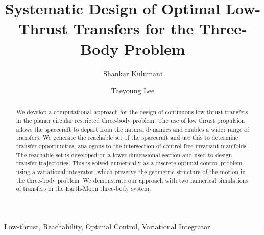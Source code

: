 \documentclass[preprint]{elsarticle}
\begin{document}
\begin{frontmatter}

\title{Systematic Design of Optimal Low-Thrust Transfers for the Three-Body Problem}


\author{Shankar Kulumani}
\address{George Washington University, 800 22nd St NW, Washington, DC 20052}

\author{Taeyoung Lee}
\address{George Washington University, 800 22nd St NW, Washington, DC 20052}


\begin{abstract}
We develop a computational approach for the design of continuous low thrust transfers in the planar circular restricted three-body problem.
The use of low thrust propulsion allows the spacecraft to depart from the natural dynamics and enables a wider range of transfers.
We generate the reachable set of the spacecraft and use this to determine transfer opportunities, analogous to the intersection of control-free invariant manifolds.
The reachable set is developed on a lower dimensional \Poincare section and used to design transfer trajectories. 
This is solved numerically as a discrete optimal control problem using a variational integrator, which preserve the geometric structure of the motion in the three-body problem.
We demonstrate our approach with two numerical simulations of transfers in the Earth-Moon three-body system.
\end{abstract}

\begin{keyword}
Low-thrust, Reachability, Optimal Control, Variational Integrator
\end{keyword}

\end{frontmatter}
\end{document}
